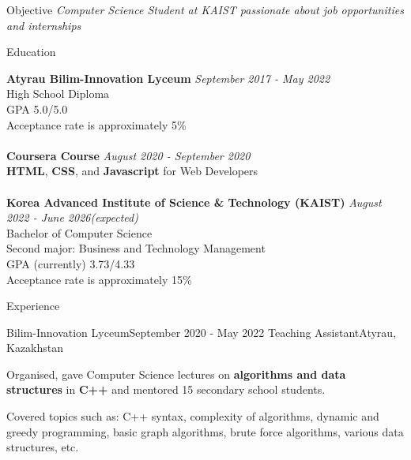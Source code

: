\documentclass{resume}
\begin{document}
\begin{rSection}{Objective}
{\emph{Computer Science Student at KAIST passionate about job opportunities and internships}}
\end{rSection}


\begin{rSection}{Education}

{\bf Atyrau Bilim-Innovation Lyceum} \hfill {\em September 2017 - May 2022} \\ 
High School Diploma\\
GPA 5.0/5.0\\
Acceptance rate is approximately 5\% \\
\\
{\bf Coursera Course} \hfill {\em August 2020 - September 2020} \\ 
{\bf HTML}, {\bf CSS}, and {\bf Javascript} for Web Developers \\
\\
{\bf Korea Advanced Institute of Science \& Technology (KAIST)} \hfill {\em August 2022 - June 2026(expected)} \\ 
Bachelor of Computer Science\\
Second major: Business and Technology Management\\
GPA (currently) 3.73/4.33\\
Acceptance rate is approximately 15\% 
\end{rSection}


\begin{rSection}{Experience}
\begin{rSubsection}{Bilim-Innovation Lyceum}{September 2020 - May 2022}{ Teaching Assistant}{Atyrau, Kazakhstan}
\item Organised, gave Computer Science lectures on {\bf algorithms and data structures} in \textbf{C++} and mentored 15 secondary school students. 
\item Covered topics such as: C++ syntax, complexity of algorithms, dynamic and greedy programming, basic graph algorithms, brute force algorithms, various data structures, etc.
\end{rSubsection}

\end{rSection}
\end{document}
